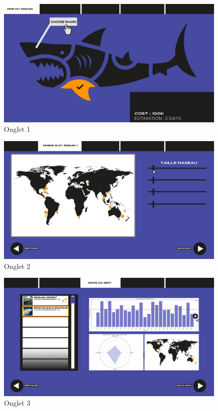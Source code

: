 \documentclass{article}
\begin{document}
\begin{figure}[!h]
	\centering
	\includegraphics[width=14.4cm]{assets/prototype/basse/onglet1}
	\caption{\label{assets/prototype/basse/onglet1} Onglet 1}
\end{figure}

\vspace{0.3cm}

\begin{figure}[!h]
	\centering
	\includegraphics[width=14.4cm]{assets/prototype/basse/onglet2}
	\caption{\label{assets/prototype/basse/onglet2} Onglet 2}
\end{figure}

\begin{figure}[!h]
	\centering
	\includegraphics[width=14.4cm]{assets/prototype/basse/onglet3}
	\caption{\label{assets/prototype/basse/onglet3} Onglet 3}
\end{figure}
\end{document}
